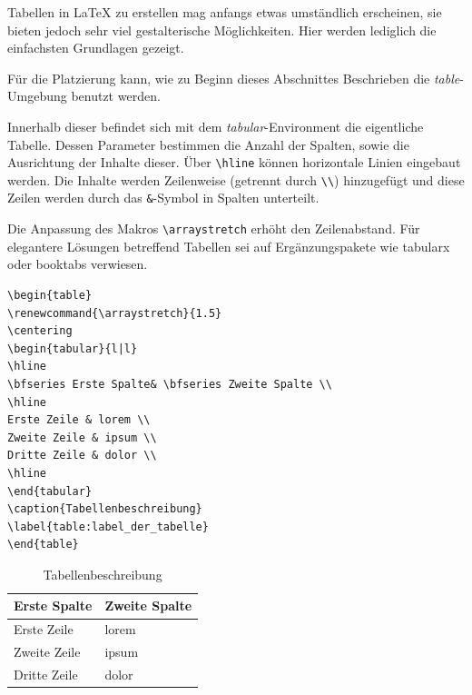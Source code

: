 Tabellen in \LaTeX{} zu erstellen mag anfangs etwas umständlich erscheinen, sie bieten jedoch sehr viel gestalterische Möglichkeiten. Hier werden lediglich die einfachsten Grundlagen gezeigt.

Für die Platzierung kann, wie zu Beginn dieses Abschnittes Beschrieben die \emph{table}-Umgebung benutzt werden.

Innerhalb dieser befindet sich mit dem \emph{tabular}-Environment die eigentliche Tabelle.
Dessen Parameter bestimmen die Anzahl der Spalten, sowie die Ausrichtung der Inhalte dieser.
Über \verb|\hline| können horizontale Linien eingebaut werden.
Die Inhalte werden Zeilenweise (getrennt durch \verb|\\|) hinzugefügt und diese Zeilen werden durch das \verb|&|-Symbol in Spalten unterteilt.

Die Anpassung des Makros \verb+\arraystretch+ erhöht den Zeilenabstand. Für elegantere Lösungen betreffend Tabellen sei auf Ergänzungspakete wie tabularx \citep{latex:tabularx} oder booktabs \citep{latex:booktabs} verwiesen.

\begin{verbatim}
\begin{table}
\renewcommand{\arraystretch}{1.5}
\centering
\begin{tabular}{l|l}
\hline
\bfseries Erste Spalte& \bfseries Zweite Spalte \\
\hline
Erste Zeile & lorem \\
Zweite Zeile & ipsum \\
Dritte Zeile & dolor \\
\hline
\end{tabular}
\caption{Tabellenbeschreibung}
\label{table:label_der_tabelle}
\end{table}
\end{verbatim}

\begin{table}
	\renewcommand{\arraystretch}{1.5}
	\centering
	\begin{tabular}{l|l}
		\hline
		\bfseries Erste Spalte& \bfseries Zweite Spalte \\
		\hline
		Erste Zeile & lorem \\
		Zweite Zeile & ipsum \\
		Dritte Zeile & dolor \\
		\hline
	\end{tabular}
	\caption{Tabellenbeschreibung}
	\label{table:label_der_tabelle}
\end{table}

